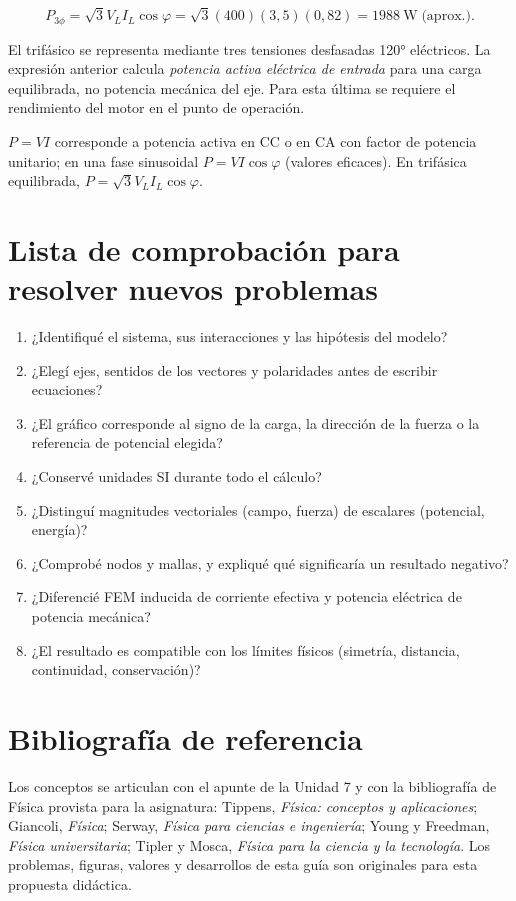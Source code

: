 \documentclass[11pt,a4paper]{article}
\begin{document}
\[P_{3\phi}=\sqrt3 V_LI_L\cos\varphi=\sqrt3(400)(3{,}5)(0{,}82)=\boxed{\SI{1988}{\watt}\;\text{(aprox.)}}.\]
\begin{resultado}El trifásico se representa mediante tres tensiones desfasadas \ang{120} eléctricos. La expresión anterior calcula \emph{potencia activa eléctrica de entrada} para una carga equilibrada, no potencia mecánica del eje. Para esta última se requiere el rendimiento del motor en el punto de operación.\end{resultado}
\begin{alerta}$P=VI$ corresponde a potencia activa en CC o en CA con factor de potencia unitario; en una fase sinusoidal $P=VI\cos\varphi$ (valores eficaces). En trifásica equilibrada, $P=\sqrt3 V_LI_L\cos\varphi$.\end{alerta}

\clearpage
\section*{Lista de comprobación para resolver nuevos problemas}
\begin{enumerate}[label=\arabic*.]
\item ¿Identifiqué el sistema, sus interacciones y las hipótesis del modelo?
\item ¿Elegí ejes, sentidos de los vectores y polaridades antes de escribir ecuaciones?
\item ¿El gráfico corresponde al signo de la carga, la dirección de la fuerza o la referencia de potencial elegida?
\item ¿Conservé unidades SI durante todo el cálculo?
\item ¿Distinguí magnitudes vectoriales (campo, fuerza) de escalares (potencial, energía)?
\item ¿Comprobé nodos y mallas, y expliqué qué significaría un resultado negativo?
\item ¿Diferencié FEM inducida de corriente efectiva y potencia eléctrica de potencia mecánica?
\item ¿El resultado es compatible con los límites físicos (simetría, distancia, continuidad, conservación)?
\end{enumerate}
\section*{Bibliografía de referencia}
Los conceptos se articulan con el apunte de la Unidad 7 y con la bibliografía de Física provista para la asignatura: Tippens, \emph{Física: conceptos y aplicaciones}; Giancoli, \emph{Física}; Serway, \emph{Física para ciencias e ingeniería}; Young y Freedman, \emph{Física universitaria}; Tipler y Mosca, \emph{Física para la ciencia y la tecnología}. Los problemas, figuras, valores y desarrollos de esta guía son originales para esta propuesta didáctica.
\end{document}
